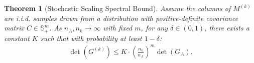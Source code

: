 \documentclass[10pt,a4paper]{amsart}
\newtheorem{theorem}{Theorem}
\begin{document}
\begin{theorem}[Stochastic Scaling Spectral Bound]
\label{thm:stochastic}
Assume the columns of $M^{(k)}$ are i.i.d. samples drawn from a distribution with positive-definite covariance matrix $C \in \mathbb{S}^m_{+}$. As $n_A, n_k \to \infty$ with fixed $m$, for any $\delta \in (0, 1)$, there exists a constant $K$ such that with probability at least $1-\delta$:
\begin{align}
    \det(G^{(k)}) \le K \cdot \left(\frac{n_k}{n_A}\right)^m \det(G_A).
\end{align}
\end{theorem}
\end{document}
